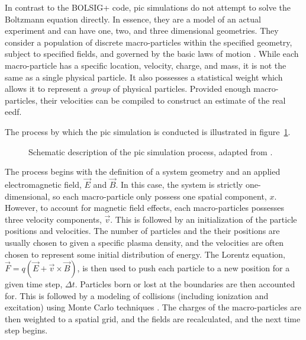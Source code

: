 In contrast to the BOLSIG+ code, \acs{pic} simulations do not attempt to solve
the Boltzmann equation directly. In essence, they are a model of an actual
experiment and can have one, two, and three dimensional geometries. They
consider a population of discrete macro-particles within the specified geometry,
subject to specified fields, and governed by the basic laws of motion
\cite{Birdsall1991}. While each macro-particle has a specific location,
velocity, charge, and mass, it is not the same as a single physical particle. It
also possesses a statistical weight which allows it to represent a \emph{group}
of physical particles. Provided enough macro-particles, their velocities can be
compiled to construct an estimate of the real \acs{eedf}.

The process by which the \acs{pic} simulation is conducted is illustrated in
figure~\ref{fig:pic}.
\begin{figure}
  \centering
  
  \caption{Schematic description of the \acs{pic} simulation process, adapted
    from \cite{Birdsall1991}.}
  \label{fig:pic}
\end{figure}
The process begins with the definition of a system geometry and an applied
electromagnetic field, $\vec{E}$ and $\vec{B}$. In this case, the system is
strictly one-dimensional, so each macro-particle only possess one spatial
component, $x$. However, to account for magnetic field effects, each
macro-particles possesses three velocity components, $\vec{v}$. This is followed
by an initialization of the particle positions and velocities. The number of
particles and the their positions are usually chosen to given a specific plasma
density, and the velocities are often chosen to represent some initial
distribution of energy. The Lorentz equation, $\vec{F} = q(\vec{E} +
\vec{v}\times\vec{B})$, is then used to push each particle to a new position for
a given time step, $\Delta t$. Particles born or lost at the boundaries are then
accounted for. This is followed by a modeling of collisions (including
ionization and excitation) using Monte Carlo techniques \cite{Birdsall1991}. The
charges of the macro-particles are then weighted to a spatial grid, and the
fields are recalculated, and the next time step begins.

